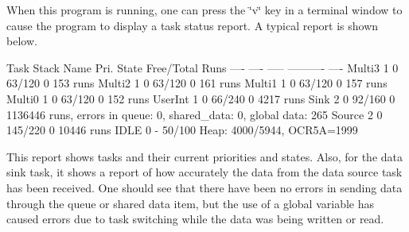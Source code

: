 When this program is running, one can press the \char`\"{}v\char`\"{} key in a terminal window to cause the program to display a task status report. A typical report is shown below. 
\begin{DoxyCode}
Task                            Stack
Name            Pri.    State   Free/Total      Runs
----            ----    -----   ----------      ----
Multi3          1       0       63/120          0        153 runs
Multi2          1       0       63/120          0        161 runs
Multi1          1       0       63/120          0        157 runs
Multi0          1       0       63/120          0        152 runs
UserInt         1       0       66/240          0        4217 runs
Sink            2       0       92/160          0       1136446 runs, errors in queue: 0, shared\_data: 0, 
      global data: 265
Source          2       0       145/220         0        10446 runs
IDLE            0       -       50/100
Heap: 4000/5944, OCR5A=1999
\end{DoxyCode}
 This report shows tasks and their current priorities and states. Also, for the data sink task, it shows a report of how accurately the data from the data source task has been received. One should see that there have been no errors in sending data through the queue or shared data item, but the use of a global variable has caused errors due to task switching while the data was being written or read. 